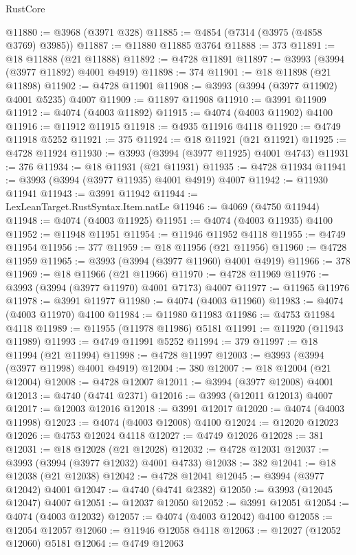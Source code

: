 \begin{lexlean}{RustCore}
\begin{coremodule}
@11880 := @3968 (@3971 @328)
@11885 := @4854 (@7314 (@3975 (@4858 @3769) @3985))
@11887 := @11880 @11885 @3764
@11888 := 373
@11891 := @18 @11888 (@21 @11888)
@11892 := @4728 @11891
@11897 := @3993 (@3994 (@3977 @11892) @4001 @4919)
@11898 := 374
@11901 := @18 @11898 (@21 @11898)
@11902 := @4728 @11901
@11908 := @3993 (@3994 (@3977 @11902) @4001 @5235) @4007
@11909 := @11897 @11908
@11910 := @3991 @11909
@11912 := @4074 (@4003 @11892)
@11915 := @4074 (@4003 @11902) @4100
@11916 := @11912 @11915
@11918 := @4935 @11916 @4118
@11920 := @4749 @11918 @5252
@11921 := 375
@11924 := @18 @11921 (@21 @11921)
@11925 := @4728 @11924
@11930 := @3993 (@3994 (@3977 @11925) @4001 @4743)
@11931 := 376
@11934 := @18 @11931 (@21 @11931)
@11935 := @4728 @11934
@11941 := @3993 (@3994 (@3977 @11935) @4001 @4919) @4007
@11942 := @11930 @11941
@11943 := @3991 @11942
@11944 := LexLeanTarget.RustSyntax.Item.natLe
@11946 := @4069 (@4750 @11944)
@11948 := @4074 (@4003 @11925)
@11951 := @4074 (@4003 @11935) @4100
@11952 := @11948 @11951
@11954 := @11946 @11952 @4118
@11955 := @4749 @11954
@11956 := 377
@11959 := @18 @11956 (@21 @11956)
@11960 := @4728 @11959
@11965 := @3993 (@3994 (@3977 @11960) @4001 @4919)
@11966 := 378
@11969 := @18 @11966 (@21 @11966)
@11970 := @4728 @11969
@11976 := @3993 (@3994 (@3977 @11970) @4001 @7173) @4007
@11977 := @11965 @11976
@11978 := @3991 @11977
@11980 := @4074 (@4003 @11960)
@11983 := @4074 (@4003 @11970) @4100
@11984 := @11980 @11983
@11986 := @4753 @11984 @4118
@11989 := @11955 (@11978 @11986) @5181
@11991 := @11920 (@11943 @11989)
@11993 := @4749 @11991 @5252
@11994 := 379
@11997 := @18 @11994 (@21 @11994)
@11998 := @4728 @11997
@12003 := @3993 (@3994 (@3977 @11998) @4001 @4919)
@12004 := 380
@12007 := @18 @12004 (@21 @12004)
@12008 := @4728 @12007
@12011 := @3994 (@3977 @12008) @4001
@12013 := @4740 (@4741 @2371)
@12016 := @3993 (@12011 @12013) @4007
@12017 := @12003 @12016
@12018 := @3991 @12017
@12020 := @4074 (@4003 @11998)
@12023 := @4074 (@4003 @12008) @4100
@12024 := @12020 @12023
@12026 := @4753 @12024 @4118
@12027 := @4749 @12026
@12028 := 381
@12031 := @18 @12028 (@21 @12028)
@12032 := @4728 @12031
@12037 := @3993 (@3994 (@3977 @12032) @4001 @4733)
@12038 := 382
@12041 := @18 @12038 (@21 @12038)
@12042 := @4728 @12041
@12045 := @3994 (@3977 @12042) @4001
@12047 := @4740 (@4741 @2382)
@12050 := @3993 (@12045 @12047) @4007
@12051 := @12037 @12050
@12052 := @3991 @12051
@12054 := @4074 (@4003 @12032)
@12057 := @4074 (@4003 @12042) @4100
@12058 := @12054 @12057
@12060 := @11946 @12058 @4118
@12063 := @12027 (@12052 @12060) @5181
@12064 := @4749 @12063

\end{coremodule}
\end{lexlean}
